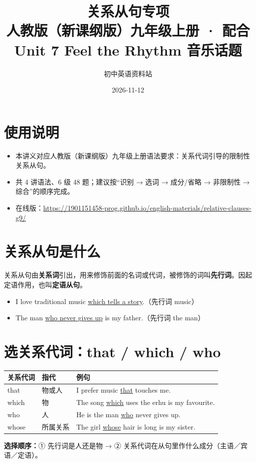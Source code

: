 \documentclass[11pt,a4paper]{ctexart}
\title{\textbf{关系从句专项}\\[4pt]
\large 人教版（新课纲版）九年级上册 · 配合 Unit 7 Feel the Rhythm 音乐话题}
\author{初中英语资料站}
\date{2026-11-12}
\begin{document}
\maketitle

\section*{使用说明}
\begin{itemize}[leftmargin=1.4em]
\item 本讲义对应人教版（新课纲版）九年级上册语法要求：关系代词引导的限制性关系从句。
\item 共 4 讲语法、6 级 48 题；建议按“识别 → 选词 → 成分/省略 → 非限制性 → 综合”的顺序完成。
\item 在线版：\url{https://1901151458-prog.github.io/english-materials/relative-clauses-g9/}
\end{itemize}

\section{关系从句是什么}
关系从句由\textbf{关系词}引出，用来修饰前面的名词或代词，被修饰的词叫\textbf{先行词}。因起定语作用，也叫\textbf{定语从句}。
\begin{itemize}[leftmargin=1.4em]
\item I love traditional music \underline{which tells a story}.（先行词 music）
\item The man \underline{who never gives up} is my father.（先行词 the man）
\end{itemize}

\section{选关系代词：that / which / who}
\begin{center}
\begin{tabular}{p{2.4cm}p{2.6cm}p{8.4cm}}
\hline
\textbf{关系代词} & \textbf{指代} & \textbf{例句}\\
\hline
that & 物或人 & I prefer music \underline{that} touches me.\\
which & 物 & The song \underline{which} uses the erhu is my favourite.\\
who & 人 & He is the man \underline{who} never gives up.\\
whose & 所属关系 & The girl \underline{whose} hair is long is my sister.\\
\hline
\end{tabular}
\end{center}
\textbf{选择顺序：}① 先行词是人还是物 → ② 关系代词在从句里作什么成分（主语／宾语／定语）。
\end{document}
